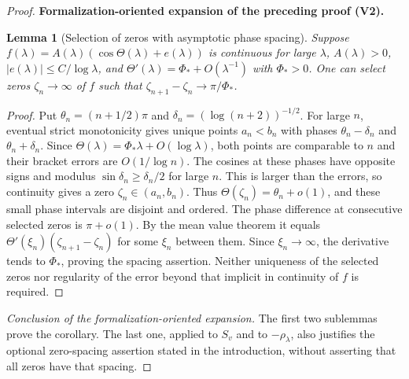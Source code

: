 \documentclass[11pt]{article}
\newtheorem{lemma}[theorem]{Lemma}
\newcommand{\formalisationparentid}{X}
\newenvironment{formalisationaddition}[1]{\par\medskip\begingroup\color{blue}\def\formalisationparentid{#1}\setcounter{formalizationsublemma}{0}\let\lemma\formalizationsublemma\let\endlemma\endformalizationsublemma
  \def\Eo{\mathcal E_h^\circ}\def\EE{\mathcal E_h}\def\phio{\phi_h^\circ}\def\phih{\phi_h}\def\Ho{H_h^{\rm atom}(v^\circ)}\def\Ha{H_h^{\rm atom}}\def\HL{H_h^{L}}\def\Dh{D_h}\def\Log{\operatorname{Log}}\def\ellh{\ell_h}\def\Gp{G_{p,h}}\def\Ast{A_{*,h}}\def\ahat{\widehat{\mathfrak a}_h}\def\ah{\mathfrak a_h}\def\rh{\widehat\rho_h}\def\deltah{\widehat\delta_h}\def\oldref##1{\textup{(##1)}}\def\interface##1{\par\noindent\textit{Analytical interface used here.} ##1\par}\def\finish{\par\noindent\textit{Conclusion of the formalization-oriented expansion.} }\par\noindent\textbf{Formalization-oriented expansion of the preceding proof (V2).}\par\smallskip
}{\par\endgroup\medskip
}
\begin{document}
\begin{proof}
\begin{formalisationaddition}{C8.7}
\begin{lemma}[Selection of zeros with asymptotic phase spacing]\label{sublemma:C8-7-spacing}
Suppose $f(\lambda)=A(\lambda)(\cos\Theta(\lambda)+e(\lambda))$ is continuous for large $\lambda$, $A(\lambda)>0$, $|e(\lambda)|\le C/\log\lambda$, and $\Theta'(\lambda)=\Phi_*+O(\lambda^{-1})$ with $\Phi_*>0$. One can select zeros $\zeta_n\to\infty$ of $f$ such that $\zeta_{n+1}-\zeta_n\to\pi/\Phi_*$.
\end{lemma}
\begin{proof}
Put $\theta_n=(n+1/2)\pi$ and $\delta_n=(\log(n+2))^{-1/2}$. For large $n$, eventual strict monotonicity gives unique points $a_n<b_n$ with phases $\theta_n-\delta_n$ and $\theta_n+\delta_n$. Since $\Theta(\lambda)=\Phi_*\lambda+O(\log\lambda)$, both points are comparable to $n$ and their bracket errors are $O(1/\log n)$. The cosines at these phases have opposite signs and modulus $\sin\delta_n\ge\delta_n/2$ for large $n$. This is larger than the errors, so continuity gives a zero $\zeta_n\in(a_n,b_n)$. Thus $\Theta(\zeta_n)=\theta_n+o(1)$, and these small phase intervals are disjoint and ordered. The phase difference at consecutive selected zeros is $\pi+o(1)$. By the mean value theorem it equals $\Theta'(\xi_n)(\zeta_{n+1}-\zeta_n)$ for some $\xi_n$ between them. Since $\xi_n\to\infty$, the derivative tends to $\Phi_*$, proving the spacing assertion. Neither uniqueness of the selected zeros nor regularity of the error beyond that implicit in continuity of $f$ is required.
\end{proof}
\finish The first two sublemmas prove the corollary. The last one, applied to $S_v$ and to $-\rho_\lambda$, also justifies the optional zero-spacing assertion stated in the introduction, without asserting that all zeros have that spacing.
\end{formalisationaddition}

\end{proof}
\end{document}

